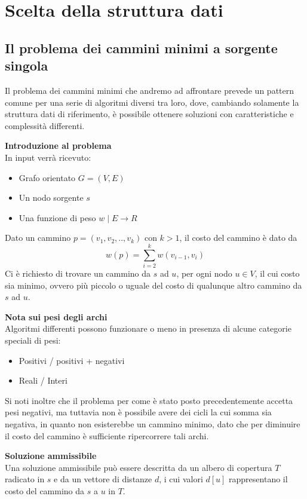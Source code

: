\documentclass[../cheatSheetAlgoritmi.tex]{subfiles}
\begin{document}
\section{Scelta della struttura dati}
\subsection{Il problema dei cammini minimi a sorgente singola}
Il problema dei cammini minimi che andremo ad affrontare prevede un pattern comune per una serie di algoritmi diversi tra loro, dove, cambiando solamente la struttura dati di riferimento, è possibile ottenere soluzioni con caratteristiche e complessità differenti.

\bigskip
\textbf{Introduzione al problema} \\
In input verrà ricevuto: 
\begin{itemize}
	\item Grafo orientato $G = (V, E)$
	\item Un nodo sorgente $s$
	\item Una funzione di peso $w \mid E \rightarrow R$
\end{itemize} 
Dato un cammino $p = (v_1, v_2, .. , v_k)$ con $k > 1$, il costo del cammino è dato da 
\begin{equation*}
	w(p) = \sum_{i = 2}^{k} w(v_{i-1}, v_i)
\end{equation*}
Ci è richiesto di trovare un cammino da $s$ ad $u$, per ogni nodo $u \in V$, il cui costo sia minimo, ovvero più piccolo o uguale del costo di qualunque altro cammino da $s$ ad $u$.

\bigskip
\textbf{Nota sui pesi degli archi} \\
Algoritmi differenti possono funzionare o meno in presenza di alcune categorie speciali di pesi:
\begin{itemize}
\item Positivi / positivi + negativi
\item Reali / Interi
\end{itemize}
Si noti inoltre che il problema per come è stato posto precedentemente accetta pesi negativi, ma tuttavia non è possibile avere dei cicli la cui somma sia negativa, in quanto non esisterebbe un cammino minimo, dato che per diminuire il costo del cammino è sufficiente ripercorrere tali archi.

\bigskip
\textbf{Soluzione ammissibile}\\
Una soluzione ammissibile può essere descritta da un albero di copertura $T$ radicato in $s$ e da un vettore di distanze $d$, i cui valori $d[u]$ rappresentano il costo del cammino da $s$ a $u$ in $T$.
\end{document}
